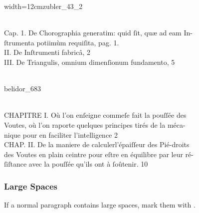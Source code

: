 \begin{sampleImageSmall}[ 1]{width=12cm}{zubler_43_2}

\begin{typeLatin}
 \\
Cap. 1.  De Chorographia generatim: quid ſit,  quæ ad eam In-\\
 ſtrumenta potiimùm requiſita,  pag. 1. \\
II.  De Inſtrumenti fabricâ,  2 \\
III.  De Triangul{is}, omnium dimenſionum fundamento,  5 \\
\someText \\
\end{typeLatin}
\end{sampleImageSmall}


\begin{sampleImage}[ 2]{belidor_683}

\begin{typeLatin}
 \\
CHAPITRE I. Où l'on enſeigne comme\lwr ſe fait la pouſſée des \\
 Voutes,  où l'on raporte quelques principes tirés de la méca- \\
 nique pour en faciliter l'intelligence  2 \\
CHAP. II.  De la maniere de calculer\lwr l'épaiſſeur des Pié-droits \\
 des Voutes en plain ceintre pour eſtre en équilibre par leur ré- \\
 ſiſtance avec la pouſſée qu'ils ont à ſoûtenir.  10  \\
\end{typeLatin}
\end{sampleImage}



\subsubsection{Large Spaces}
\begin{mainrule}
If a normal paragraph contains large spaces, mark them with .
\end{mainrule}

